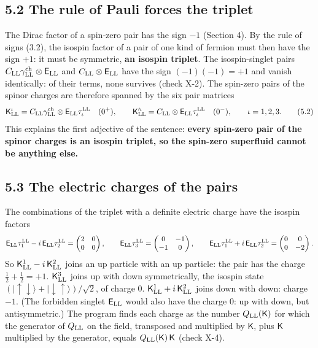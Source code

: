 \documentclass[
  10pt,
]{article}
\begin{document}
\hypertarget{the-rule-of-pauli-forces-the-triplet}{%
\subsection{5.2 The rule of Pauli forces the
triplet}\label{the-rule-of-pauli-forces-the-triplet}}

The Dirac factor of a spin-zero pair has the sign \(-1\) (Section 4). By
the rule of signs (3.2), the isospin factor of a pair of one kind of
fermion must then have the sign \(+1\): it must be symmetric, \textbf{an
isospin triplet}. The isospin-singlet pairs
\(C_{\rm LL}\gamma^{\rm ch}_{\rm LL}\otimes\mathsf E_{\rm LL}\) and
\(C_{\rm LL}\otimes\mathsf E_{\rm LL}\) have the sign \((-1)(-1)=+1\)
and vanish identically: of their terms, none survives (check X-2). The
spin-zero pairs of the spinor charges are therefore spanned by the six
pair matrices
\[\mathsf K^\iota_{\rm LL}=C_{\rm LL}\gamma^{\rm ch}_{\rm LL}\otimes\mathsf E_{\rm LL}\tau^{\rm LL}_\iota\quad(0^+),\qquad\mathsf K'^\iota_{\rm LL}=C_{\rm LL}\otimes\mathsf E_{\rm LL}\tau^{\rm LL}_\iota\quad(0^-),\qquad\iota=1,2,3. \tag{5.2}\]
This explains the first adjective of the sentence: \textbf{every
spin-zero pair of the spinor charges is an isospin triplet, so the
spin-zero superfluid cannot be anything else.}

\hypertarget{the-electric-charges-of-the-pairs}{%
\subsection{5.3 The electric charges of the
pairs}\label{the-electric-charges-of-the-pairs}}

The combinations of the triplet with a definite electric charge have the
isospin factors
\[\mathsf E_{\rm LL}\tau^{\rm LL}_1-i\,\mathsf E_{\rm LL}\tau^{\rm LL}_2=\begin{pmatrix}2&0\\0&0\end{pmatrix},\qquad\mathsf E_{\rm LL}\tau^{\rm LL}_3=\begin{pmatrix}0&-1\\-1&0\end{pmatrix},\qquad\mathsf E_{\rm LL}\tau^{\rm LL}_1+i\,\mathsf E_{\rm LL}\tau^{\rm LL}_2=\begin{pmatrix}0&0\\0&-2\end{pmatrix}.\]
So \(\mathsf K^1_{\rm LL}-i\,\mathsf K^2_{\rm LL}\) joins an up particle
with an up particle: the pair has the charge \(\tfrac12+\tfrac12=+1\).
\(\mathsf K^3_{\rm LL}\) joins up with down symmetrically, the isospin
state
\((\lvert\uparrow\downarrow\rangle+\lvert\downarrow\uparrow\rangle)/\sqrt2\),
of charge 0. \(\mathsf K^1_{\rm LL}+i\,\mathsf K^2_{\rm LL}\) joins down
with down: charge \(-1\). (The forbidden singlet \(\mathsf E_{\rm LL}\)
would also have the charge 0: up with down, but antisymmetric.) The
program finds each charge as the number \(Q_{\rm LL}(\mathsf K)\) for
which the generator of \(Q_{\rm LL}\) on the field, transposed and
multiplied by \(\mathsf K\), plus \(\mathsf K\) multiplied by the
generator, equals \(Q_{\rm LL}(\mathsf K)\,\mathsf K\) (check X-4).
\end{document}
